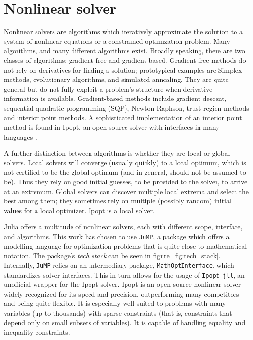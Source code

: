\section{Nonlinear solver}

Nonlinear solvers are algorithms which iteratively approximate the solution to a system of nonlinear equations or a constrained optimization problem. Many algorithms, and many different algorithms exist. Broadly speaking, there are two classes of algorithms: gradient-free and gradient based. Gradient-free methods do not rely on derivatives for finding a solution; prototypical examples are Simplex methods, evolutionary algorithms, and simulated annealing. They are quite general but do not fully exploit a problem's structure when derivative information is available. Gradient-based methods include gradient descent, sequential quadratic programming (SQP), Newton-Raphson, trust-region methods and interior point methods. A sophisticated implementation of an interior point method is found in Ipopt, an open-source solver with interfaces in many languages~\cite{ipopt}.

A further distinction between algorithms is whether they are local or global solvers. Local solvers will converge (usually quickly) to a local optimum, which is not certified to be the global optimum (and in general, should not be assumed to be). Thus they rely on good initial guesses, to be provided to the solver, to arrive at an extremum. Global solvers can discover multiple local extrema and select the best among them; they sometimes rely on multiple (possibly random) initial values for a local optimizer. Ipopt is a local solver.

Julia offers a multitude of nonlinear solvers, each with different scope, interface, and algorithms. This work has chosen to use \texttt{JuMP}, a package which offers a modelling language for optimization problems that is quite close to mathematical notation. The package's \textit{tech stack} can be seen in figure~\ref{fig:tech_stack}. Internally, \texttt{JuMP} relies on an intermediary package, \texttt{MathOptInterface}, which standardizes solver interfaces. This in turn allows for the usage of \texttt{Ipopt\_jll}, an unofficial wrapper for the Ipopt solver. Ipopt is an open-source nonlinear solver widely recognized for its speed and precision, outperforming many competitors and being quite flexible. It is especially well suited to problems with many variables (up to thousands) with sparse constraints (that is, constraints that depend only on small subsets of variables). It is capable of handling equality and inequality constraints.

